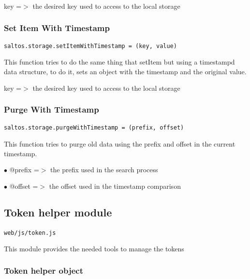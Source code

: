 \documentclass[a4paper]{article}
\begin{document}
key =$>$ the desired key used to access to the local storage

\hypertarget{toc295}{}
\subsubsection{Set Item With Timestamp}

\begin{lstlisting}
saltos.storage.setItemWithTimestamp = (key, value)
\end{lstlisting}

This function tries to do the same thing that setItem but using a timestampd data
structure, to do it, sets an object with the timestamp and the original value.

key =$>$ the desired key used to access to the local storage

\hypertarget{toc296}{}
\subsubsection{Purge With Timestamp}

\begin{lstlisting}
saltos.storage.purgeWithTimestamp = (prefix, offset)
\end{lstlisting}

This function tries to purge old data using the prefix and offset in the current
timestamp.

\begin{compactitem}
\item[\color{myblue}$\bullet$] @prefix =$>$ the prefix used in the search process
\item[\color{myblue}$\bullet$] @offset =$>$ the offset used in the timestamp comparison
\end{compactitem}

\hypertarget{toc297}{}
\subsection{Token helper module}

\begin{lstlisting}
web/js/token.js
\end{lstlisting}

This module provides the needed tools to manage the tokens

\hypertarget{toc298}{}
\subsubsection{Token helper object}
\end{document}
